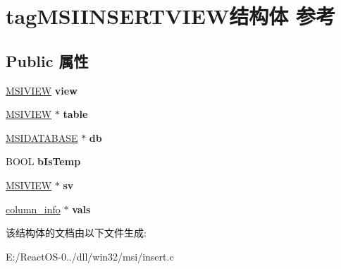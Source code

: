 \hypertarget{structtag_m_s_i_i_n_s_e_r_t_v_i_e_w}{}\section{tag\+M\+S\+I\+I\+N\+S\+E\+R\+T\+V\+I\+E\+W结构体 参考}
\label{structtag_m_s_i_i_n_s_e_r_t_v_i_e_w}
\subsection*{Public 属性}
\begin{DoxyCompactItemize}
\item 
\mbox{\label{structtag_m_s_i_i_n_s_e_r_t_v_i_e_w_a07b9265acf611ae82aafd449e8bd4fad}} 
\hyperlink{structtag_m_s_i_v_i_e_w}{M\+S\+I\+V\+I\+EW} {\bfseries view}
\item 
\mbox{\label{structtag_m_s_i_i_n_s_e_r_t_v_i_e_w_ab97d115c44b6a02ef4a59c4a1cfdcbe4}} 
\hyperlink{structtag_m_s_i_v_i_e_w}{M\+S\+I\+V\+I\+EW} $\ast$ {\bfseries table}
\item 
\mbox{\label{structtag_m_s_i_i_n_s_e_r_t_v_i_e_w_a04ec1034c0cc38d611e2dd471701eed8}} 
\hyperlink{structtag_m_s_i_d_a_t_a_b_a_s_e}{M\+S\+I\+D\+A\+T\+A\+B\+A\+SE} $\ast$ {\bfseries db}
\item 
\mbox{\label{structtag_m_s_i_i_n_s_e_r_t_v_i_e_w_af425c78ef4f4acffe737f68dae7be0b4}} 
B\+O\+OL {\bfseries b\+Is\+Temp}
\item 
\mbox{\label{structtag_m_s_i_i_n_s_e_r_t_v_i_e_w_a0fe4e1d06d2ae1c3edec16dd448ba30b}} 
\hyperlink{structtag_m_s_i_v_i_e_w}{M\+S\+I\+V\+I\+EW} $\ast$ {\bfseries sv}
\item 
\mbox{\label{structtag_m_s_i_i_n_s_e_r_t_v_i_e_w_afb2677184e3a8271e311d22e92805c1d}} 
\hyperlink{struct__column__info}{column\+\_\+info} $\ast$ {\bfseries vals}
\end{DoxyCompactItemize}


该结构体的文档由以下文件生成\+:\begin{DoxyCompactItemize}
\item 
E\+:/\+React\+O\+S-\/0../dll/win32/msi/insert.\+c\end{DoxyCompactItemize}
